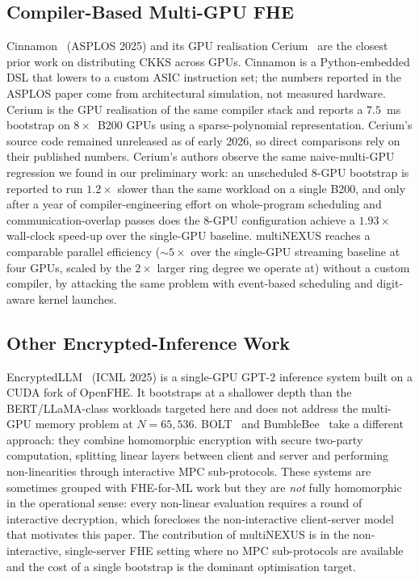 \documentclass[conference]{IEEEtran}
\begin{document}
\subsection{Compiler-Based Multi-GPU FHE}
Cinnamon~\cite{Jayashankar2025-asplos} (ASPLOS 2025) and its GPU
realisation Cerium~\cite{Jayashankar2025-arxiv} are the closest prior
work on distributing CKKS across GPUs. Cinnamon is a Python-embedded
DSL that lowers to a custom ASIC instruction set; the numbers reported
in the ASPLOS paper come from architectural simulation, not measured
hardware. Cerium is the GPU realisation of the same compiler stack and
reports a $7.5$~ms bootstrap on $8\times$~B200 GPUs using a
sparse-polynomial representation. Cerium's source code remained
unreleased as of early 2026, so direct comparisons rely on their
published numbers. Cerium's authors observe the same naive-multi-GPU
regression we found in our preliminary work: an unscheduled $8$-GPU
bootstrap is reported to run $1.2\times$ slower than the same workload
on a single B200, and only after a year of compiler-engineering effort
on whole-program scheduling and communication-overlap passes does the
$8$-GPU configuration achieve a $1.93\times$ wall-clock speed-up over
the single-GPU baseline. multiNEXUS reaches a comparable parallel
efficiency ($\sim$$5\times$ over the single-GPU streaming baseline at
four GPUs, scaled by the $2\times$ larger ring degree we operate at)
without a custom compiler, by attacking the same problem with
event-based scheduling and digit-aware kernel launches.

\subsection{Other Encrypted-Inference Work}
EncryptedLLM~\cite{DeCastro2025} (ICML 2025) is a single-GPU GPT-2
inference system built on a CUDA fork of OpenFHE. It bootstraps at a
shallower depth than the BERT/LLaMA-class workloads targeted here and
does not address the multi-GPU memory problem at $N{=}65{,}536$.
BOLT~\cite{Bolt} and BumbleBee~\cite{Bumblebee2025} take a different
approach: they combine homomorphic encryption with secure two-party
computation, splitting linear layers between client and server and
performing non-linearities through interactive MPC sub-protocols.
These systems are sometimes grouped with FHE-for-ML work but they are
\emph{not} fully homomorphic in the operational sense: every
non-linear evaluation requires a round of interactive decryption,
which forecloses the non-interactive client-server model that
motivates this paper. The contribution of multiNEXUS is in the
non-interactive, single-server FHE setting where no MPC sub-protocols
are available and the cost of a single bootstrap is the dominant
optimisation target.
\end{document}
